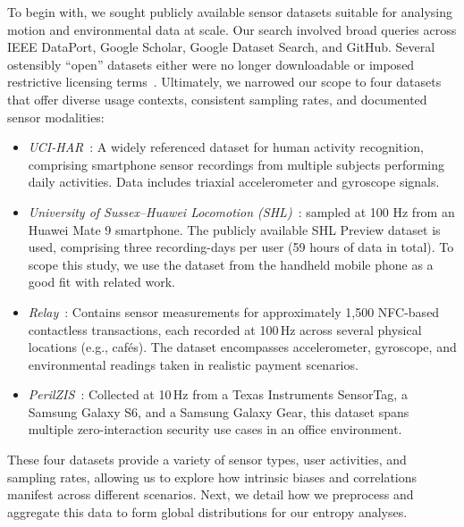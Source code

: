 To begin with, we sought publicly available sensor datasets suitable for analysing motion and environmental data at scale. Our search involved broad queries across IEEE DataPort, Google Scholar, Google Dataset Search, and GitHub. Several ostensibly ``open'' datasets either were no longer downloadable or imposed restrictive licensing terms~\cite{Mahbub_Btas2016_UMDAA02,stragapede2023behavepassdb,acien2021becaptcha}. Ultimately, we narrowed our scope to four datasets that offer diverse usage contexts, consistent sampling rates, and documented sensor modalities:

\begin{itemize}
    \item \emph{UCI-HAR}~\cite{anguita2013public}:  A widely referenced dataset for human activity recognition, comprising smartphone sensor recordings from multiple subjects performing daily activities. Data includes triaxial accelerometer and gyroscope signals.

    
    \item \emph{University of Sussex--Huawei Locomotion (SHL)}~\cite{gjoreski2018university,wang2019enabling}:   sampled at 100 Hz from an Huawei Mate 9 smartphone. The publicly available SHL Preview dataset is used, comprising three recording-days per user (59 hours of data in total). To scope this study, we use the dataset from the handheld mobile phone as a good fit with related work.
    \item \emph{Relay}~\cite{gurulian2017effectiveness}: Contains sensor measurements for approximately 1{,}500 NFC-based contactless transactions, each recorded at 100\,Hz across several physical locations (e.g., caf\'{e}s). The dataset encompasses accelerometer, gyroscope, and environmental readings taken in realistic payment scenarios.
    \item \emph{PerilZIS}~\cite{fomichev2019perils}: Collected at 10\,Hz from a Texas Instruments SensorTag, a Samsung Galaxy S6, and a Samsung Galaxy Gear, this dataset spans multiple zero-interaction security use cases in an office environment.
\end{itemize}

These four datasets provide a variety of sensor types, user activities, and sampling rates, allowing us to explore how intrinsic biases and correlations manifest across different scenarios. Next, we detail how we preprocess and aggregate this data to form global distributions for our entropy analyses.